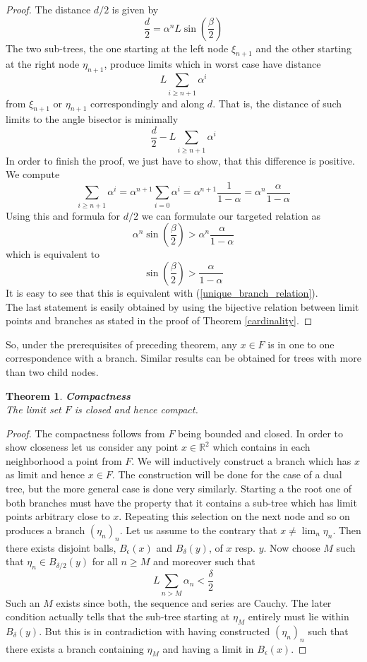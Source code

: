 \documentclass[17pt]{extarticle}
\newtheorem{theorem}{Theorem}
\begin{document}
\begin{proof}
	The distance $d/2$ is given by 
	$$
	\frac{d}{2}=\alpha^{n}L\sin\left(\frac{\beta}{2}\right)
	$$
	The two sub-trees, the one starting at the left node $\xi_{n+1}$ and the other starting at the right node $\eta_{n+1}$, produce limits which in worst case have distance 
	$$
	L\sum_{i\geq n+1}\alpha^i
	$$
	from  $\xi_{n+1}$ or $\eta_{n+1}$ correspondingly and along $d$. That is, the distance of such limits to the angle bisector is minimally 
	$$
	\frac{d}{2}-L\sum_{i\geq n+1}\alpha^i
	$$
	In order to finish the proof, we just have to show, that this difference is positive. We compute
	$$
	\sum_{i\geq n+1}\alpha^i=\alpha^{n+1}\sum_{i=0}\alpha^i=\alpha^{n+1}\frac{1}{1-\alpha}=
	\alpha^{n}\frac{\alpha}{1-\alpha}
	$$
	Using this and formula for $d/2$ we can formulate our targeted relation as
	$$
	\alpha^{n}\sin\left(\frac{\beta}{2}\right)>\alpha^n\frac{\alpha}{1-\alpha}
	$$
	which is equivalent to
	$$
	\sin\left(\frac{\beta}{2}\right)>\frac{\alpha}{1-\alpha}
	$$
	It is easy to see that this is equivalent with (\ref{unique_branch_relation}).\\
	The last statement is easily obtained by using the bijective relation between limit points and branches as stated in the proof of Theorem \ref{cardinality}.	
\end{proof}
So, under the prerequisites of preceding theorem, any $x\in F$ is in one to one correspondence with a branch. Similar results can be obtained for trees with more than two child nodes.

\begin{theorem}
	\textbf{Compactness}\\
	The limit set $F$ is closed and hence compact.
\end{theorem}
\begin{proof}
	The compactness follows from $F$ being bounded and closed. In order to show closeness let us consider any point $x\in\mathbb{R}^2$ which contains in each neighborhood a point from $F$. We will inductively construct a branch which has $x$ as limit and hence $x\in F$. The construction will be done for the case of a dual tree, but the more general case is done very similarly. Starting a the root one of both branches must have the property that it contains a sub-tree which has limit points arbitrary close to $x$. Repeating this selection on the next node and so on produces a branch $(\eta_n)_n$. Let us assume to the contrary that $x\neq\lim_n\eta_n$. Then there exists disjoint balls, $B_{\epsilon}(x)$ and $B_{\delta}(y)$, of $x$ resp. $y$. Now choose $M$ such that $\eta_n\in B_{\delta/2}(y)$ for all $n\geq M$ and moreover such that
	$$
	L\sum_{n>M}\alpha_n < \frac{\delta}{2}
	$$
	Such an $M$ exists since both, the sequence and series are Cauchy. The later condition actually tells that the sub-tree starting at $\eta_{M}$ entirely must lie within $B_{\delta}(y)$. But this is in contradiction with having constructed $(\eta_n)_n$ such that there exists a branch containing $\eta_M$ and having a limit in $B_{\epsilon}(x)$.
\end{proof}
\end{document}
